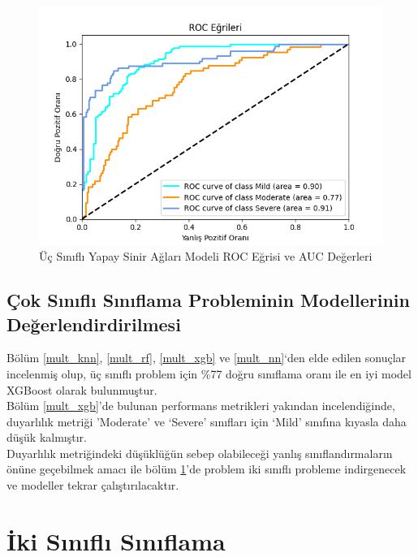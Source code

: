 \documentclass[12pt,twoside]{deuthesis}
\begin{document}
\begin{figure}

{\centering \includegraphics[width=1.05\linewidth,height=0.6\textheight]{figure/roc_curve_MLPClassifier} 

}

\caption{Üç Sınıflı Yapay Sinir Ağları Modeli ROC Eğrisi ve AUC Değerleri}\label{fig:unnamed-chunk-49}
\end{figure}
\hypertarget{uxe7ok-sux131nux131flux131-sux131nux131flama-probleminin-modellerinin-deux11ferlendirdirilmesi}{%
\subsection{Çok Sınıflı Sınıflama Probleminin Modellerinin Değerlendirdirilmesi}\label{uxe7ok-sux131nux131flux131-sux131nux131flama-probleminin-modellerinin-deux11ferlendirdirilmesi}}

Bölüm \ref{mult_knn}, \ref{mult_rf}, \ref{mult_xgb} ve \ref{mult_nn}`den elde edilen sonuçlar incelenmiş olup, üç sınıflı problem için \%77 doğru sınıflama oranı ile en iyi model XGBoost olarak bulunmuştur.\\
Bölüm \ref{mult_xgb}'de bulunan performans metrikleri yakından incelendiğinde, duyarlılık metriği 'Moderate' ve `Severe' sınıfları için `Mild' sınıfına kıyasla daha düşük kalmıştır.\\
Duyarlılık metriğindeki düşüklüğün sebep olabileceği yanlış sınıflandırmaların önüne geçebilmek amacı ile bölüm \ref{binary}'de problem iki sınıflı probleme indirgenecek ve modeller tekrar çalıştırılacaktır.

\hypertarget{binary}{%
\section{İki Sınıflı Sınıflama}\label{binary}}
\end{document}
